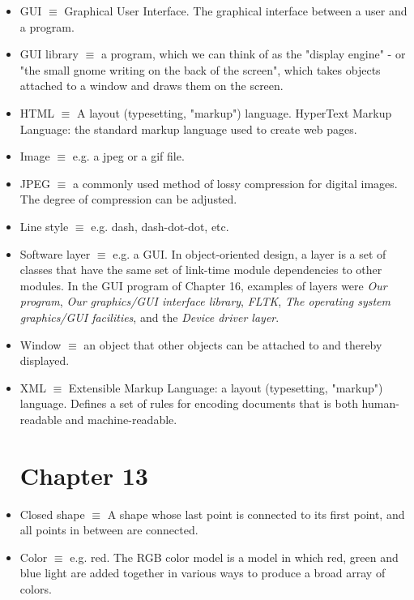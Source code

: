 \documentclass[12pt]{article}
\begin{document}
\begin{itemize}
\item GUI $\equiv$ Graphical User Interface. The graphical interface between a user and a program.

\item GUI library $\equiv$ a program, which we can think of as the "display engine" - or "the small gnome writing on the back of the screen", which takes objects attached to a window and draws them on the screen.

\item HTML $\equiv$ A layout (typesetting, "markup") language. HyperText Markup Language: the standard markup language used to create web pages.

\item Image $\equiv$ e.g. a jpeg or a gif file.

\item JPEG $\equiv$ a commonly used method of lossy compression for digital images. The degree of compression can be adjusted.

\item Line style $\equiv$ e.g. dash, dash-dot-dot, etc.

\item Software layer $\equiv$ e.g. a GUI. In object-oriented design, a layer is a set of classes that have the same set of link-time module dependencies to other modules. In the GUI program of Chapter 16, examples of layers were \textit{Our program}, \textit{Our graphics/GUI interface library}, \textit{FLTK}, \textit{The operating system graphics/GUI facilities}, and the \textit{Device driver layer}.

\item Window $\equiv$ an object that other objects can be attached to and thereby displayed.

\item XML $\equiv$ Extensible Markup Language: a layout (typesetting, "markup") language. Defines a set of rules for encoding documents that is both human-readable and machine-readable.

\section*{Chapter 13}

\item Closed shape $\equiv$ A shape whose last point is connected to its first point, and all points in between are connected.

\item Color $\equiv$ e.g. red. The RGB color model is a model in which red, green and blue light are added together in various ways to produce a broad array of colors.


\end{itemize}
\end{document}
